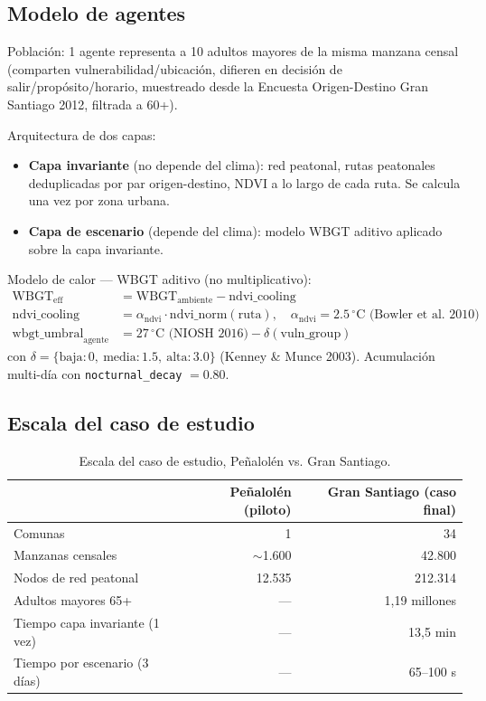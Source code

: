 \documentclass[11pt,a4paper]{article}
\begin{document}
\subsection{Modelo de agentes}

Población: 1 agente representa a 10 adultos mayores de la misma manzana
censal (comparten vulnerabilidad/ubicación, difieren en decisión de
salir/propósito/horario, muestreado desde la Encuesta Origen-Destino Gran
Santiago 2012, filtrada a 60+).

Arquitectura de dos capas:
\begin{itemize}[leftmargin=*]
    \item \textbf{Capa invariante} (no depende del clima): red peatonal,
        rutas peatonales deduplicadas por par origen-destino, NDVI a lo
        largo de cada ruta. Se calcula una vez por zona urbana.
    \item \textbf{Capa de escenario} (depende del clima): modelo WBGT
        aditivo aplicado sobre la capa invariante.
\end{itemize}

Modelo de calor --- WBGT aditivo (no multiplicativo):
\begin{align}
    \mathrm{WBGT}_{\mathrm{eff}} &= \mathrm{WBGT}_{\mathrm{ambiente}} -
        \mathrm{ndvi\_cooling} \\
    \mathrm{ndvi\_cooling} &= \alpha_{\mathrm{ndvi}} \cdot
        \mathrm{ndvi\_norm}(\mathrm{ruta}), \quad
        \alpha_{\mathrm{ndvi}} = 2.5\,^\circ\mathrm{C}
        \text{ (Bowler et al. 2010)} \\
    \mathrm{wbgt\_umbral}_{\mathrm{agente}} &= 27\,^\circ\mathrm{C}
        \text{ (NIOSH 2016)} - \delta(\mathrm{vuln\_group})
\end{align}
con $\delta = \{\text{baja}: 0,\ \text{media}: 1.5,\ \text{alta}: 3.0\}$
(Kenney \& Munce 2003). Acumulación multi-día con
\texttt{nocturnal\_decay} $= 0.80$.

\subsection{Escala del caso de estudio}

\begin{table}[h]
\centering
\begin{tabular}{lrr}
\toprule
 & Peñalolén (piloto) & Gran Santiago (caso final) \\
\midrule
Comunas & 1 & 34 \\
Manzanas censales & $\sim$1.600 & 42.800 \\
Nodos de red peatonal & 12.535 & 212.314 \\
Adultos mayores 65+ & --- & 1,19 millones \\
Tiempo capa invariante (1 vez) & --- & 13,5 min \\
Tiempo por escenario (3 días) & --- & 65--100 s \\
\bottomrule
\end{tabular}
\caption{Escala del caso de estudio, Peñalolén vs. Gran Santiago.}
\label{tab:escala}
\end{table}
\end{document}
